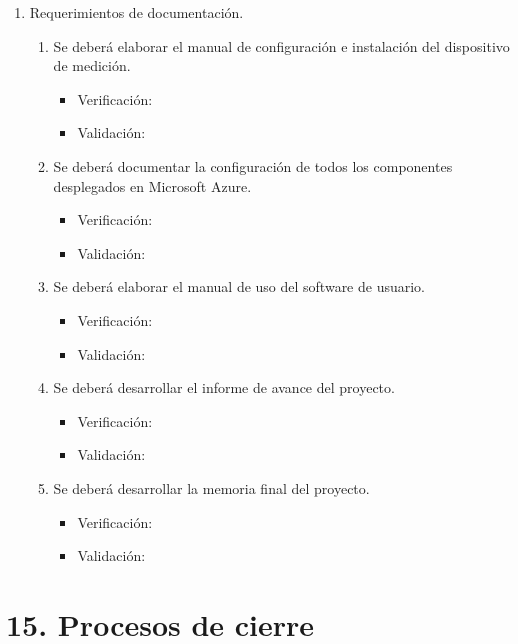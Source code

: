 \documentclass[
11pt, %
]{charter}
\begin{document}
\begin{enumerate}
	\item Requerimientos de documentación.
		\begin{enumerate}
			\item Se deberá elaborar el manual de configuración e instalación del dispositivo de medición.
			\begin{itemize}
				\item Verificación:
				\item Validación: 
			\end{itemize}			
			\item Se deberá documentar la configuración de todos los componentes desplegados en Microsoft Azure.
			\begin{itemize}
				\item Verificación:
				\item Validación: 
			\end{itemize}
			\item Se deberá elaborar el manual de uso del software de usuario.
			\begin{itemize}
				\item Verificación:
				\item Validación: 
			\end{itemize}
			\item Se deberá desarrollar el informe de avance del proyecto.
			\begin{itemize}
				\item Verificación:
				\item Validación: 
			\end{itemize}
			\item Se deberá desarrollar la memoria final del proyecto.
			\begin{itemize}
				\item Verificación:
				\item Validación: 
			\end{itemize}
		\end{enumerate}
		
	\end{enumerate}

\section{15. Procesos de cierre}    
\label{sec:cierre}
\end{document}
